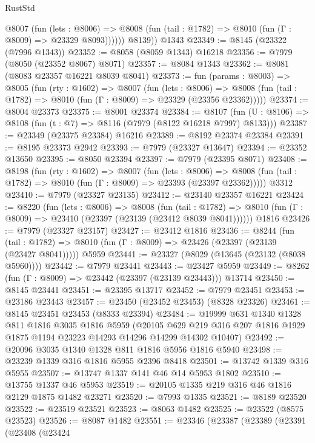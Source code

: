 \begin{lexlean}{RustStd}
\begin{coremodule}
            @8007
              (fun (lets : @8006) =>
              @8008 (fun (tail : @1782) => @8010 (fun (Γ : @8009) => @23329 @8093))))))
        @8139))
    @1343
@23349 := @8145 (@23322 (@7996 @1343))
@23352 := @8058 (@8059 @1343) @16218
@23356 := @7979 (@8050 (@23352 @8067) @8071)
@23357 := @8084 @1343
@23362 := @8081 (@8083 @23357 @16221 @8039 @8041)
@23373 := fun (params : @8003) =>
  @8005
    (fun (rty : @1602) =>
    @8007
      (fun (lets : @8006) =>
      @8008 (fun (tail : @1782) => @8010 (fun (Γ : @8009) => @23329 (@23356 @23362)))))
@23374 := @8004 @23373
@23375 := @8001 @23374
@23384 := @8107
    (fun (U : @8106) => @8108 (fun (t : @7) => @8116 (@7979 (@8122 @16218 @7997) @8133)))
@23387 := @23349 (@23375 @23384) @16216
@23389 := @8192 @23374 @23384
@23391 := @8195 @23373 @2942
@23393 := @7979 (@23327 @13647)
@23394 := @23352 @13650
@23395 := @8050 @23394
@23397 := @7979 (@23395 @8071)
@23408 := @8198
    (fun (rty : @1602) =>
    @8007
      (fun (lets : @8006) =>
      @8008 (fun (tail : @1782) => @8010 (fun (Γ : @8009) => @23393 (@23397 @23362)))))
    @3312
@23410 := @7979 (@23327 @23135)
@23412 := @23140 @23357 @16221
@23424 := @8220
    (fun (lets : @8006) =>
    @8008
      (fun (tail : @1782) =>
      @8010 (fun (Γ : @8009) => @23410 (@23397 (@23139 (@23412 @8039 @8041))))))
    @1816
@23426 := @7979 (@23327 @23157)
@23427 := @23412 @1816
@23436 := @8244
    (fun (tail : @1782) => @8010 (fun (Γ : @8009) => @23426 (@23397 (@23139 (@23427 @8041)))))
    @5959
@23441 := @23327 (@8029 (@13645 (@23132 (@8038 @5960))))
@23442 := @7979 @23441
@23443 := @23427 @5959
@23449 := @8262 (fun (Γ : @8009) => @23442 (@23397 (@23139 @23443))) @13714
@23450 := @8145 @23441
@23451 := @23395 @13717
@23452 := @7979 @23451
@23453 := @23186 @23443
@23457 := @23450 (@23452 @23453) (@8328 @23326)
@23461 := @8145 @23451 @23453 (@8333 @23394)
@23484 := @19999
    @631
    @1340
    @1328
    @811
    @1816
    @3035
    @1816
    @5959
    (@20105 @629 @219 @316 @207 @1816 @1929 @1875 @1194 @23223 @14293 @14296 @14299 @14302 @10407)
@23492 := @20096 @3035 @1340 @1328 @811 @1816 @5956 @1816 @5940
@23498 := @23239 @1339 @316 @1816 @5955 @2396 @8418
@23501 := @13742 @1339 @316 @5955
@23507 := @13747 @1337 @141 @46 @14 @5953 @1802
@23510 := @13755 @1337 @46 @5953
@23519 := @20105 @1335 @219 @316 @46 @1816 @2129 @1875 @1482 @23271
@23520 := @7993 @1335
@23521 := @8189 @23520
@23522 := @23519 @23521
@23523 := @8063 @1482
@23525 := @23522 (@8575 @23523)
@23526 := @8087 @1482
@23551 := @23346
    (@23387
      (@23389
        (@23391
          (@23408
            (@23424

\end{coremodule}
\end{lexlean}

